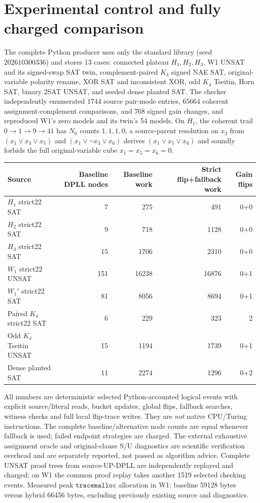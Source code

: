 \documentclass[10pt]{article}
\begin{document}
\section*{Experimental control and fully charged comparison}
The complete Python producer uses only the standard library (seed $202610300336$) and stores 13 cases: connected plateau $H_1,H_2,H_3$, W1 UNSAT and its signed-swap SAT twin, complement-paired $K_4$ signed NAE SAT, original-variable polarity rename, XOR SAT and inconsistent XOR, odd $K_4$ Tseitin, Horn SAT, binary 2SAT UNSAT, and seeded dense planted SAT. The checker independently enumerated $1744$ source pair-mode entries, $65664$ coherent assignment-complement comparisons, and $768$ signed gain changes, and reproduced W1's zero models and its twin's 54 models. On $H_1$, the coherent trail $0\to1\to9\to41$ has $N_0$ counts $1,1,1,0$; a source-parent resolution on $x_3$ from $(x_1\vee x_3\vee x_5)$ and $(x_1\vee\neg x_3\vee x_6)$ derives $(x_1\vee x_5\vee x_6)$ and soundly forbids the full original-variable cube $x_1=x_5=x_6=0$.
\begin{center}\small\begin{tabular}{lrrrr}
\toprule Source & Baseline DPLL nodes & Baseline work & Strict flip+fallback work & Gain flips\\\midrule
$H_1$ strict22 SAT&7&275&491&0+0\\
$H_2$ strict22 SAT&9&718&1128&0+0\\
$H_3$ strict22 SAT&15&1706&2310&0+0\\
$W_1$ strict22 UNSAT&151&16238&16876&0+1\\
$W_1'$ strict22 SAT&81&8056&8694&0+1\\
Paired $K_4$ strict22 SAT&6&229&323&2\\
Odd $K_4$ Tseitin UNSAT&15&1194&1739&0+1\\
Dense planted SAT&11&2274&1296&0+2\\\bottomrule
\end{tabular}\end{center}
All numbers are deterministic selected Python-accounted logical events with explicit source/literal reads, bucket updates, global flips, fallback searches, witness checks and full local flip-trace writes. They are \emph{not} native CPU/Turing instructions. The complete baseline/alternative node counts are equal whenever fallback is used; failed endpoint strategies are charged. The external exhaustive assignment oracle and original-clause S/U diagnostics are scientific verification overhead and are separately reported, not passed as algorithm advice. Complete UNSAT proof trees from source-UP-DPLL are independently replayed and charged; on W1 the common proof replay takes another 1519 selected checking events. Measured peak $\mathtt{tracemalloc}$ allocation in W1: baseline 59128 bytes versus hybrid 66456 bytes, excluding previously existing source and diagnostics.
\end{document}
